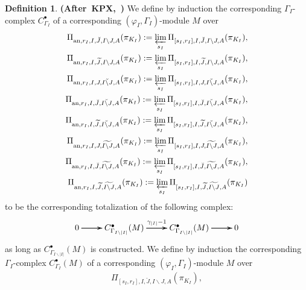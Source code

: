 \documentclass[12pt]{amsart}
\theoremstyle{definition}
\newtheorem{definition}[theorem]{Definition}
\numberwithin{equation}{section}
\begin{document}
\begin{definition} \mbox{\bf{(After KPX, \cite[Definition 2.3.3]{KPX})}}
We define by induction the corresponding $\Gamma_I$-complex $C^\bullet_{\Gamma_I}$ of a corresponding $(\varphi_I,\Gamma_I)$-module $M$ over 
\begin{align}
\Pi_{\mathrm{an},r_I,I,\breve{J},I\backslash J,A}(\pi_{K_I}):=\varprojlim_{s_I}\Pi_{[s_I,r_I],I,\breve{J},I\backslash J,A}(\pi_{K_I}),\\	
\Pi_{\mathrm{an},r_I,I,\widetilde{J},I\backslash J,A}(\pi_{K_I}):=\varprojlim_{s_I} \Pi_{[s_I,r_I],I,\widetilde{J},I\backslash J,A}(\pi_{K_I}),\\
\Pi_{\mathrm{an},r_I,I,J,\breve{I\backslash J},A}(\pi_{K_I}):=\varprojlim_{s_I}\Pi_{[s_I,r_I],I,J,\breve{I\backslash J},A}(\pi_{K_I}),\\	
\Pi_{\mathrm{an},r_I,I,\breve{J},\breve{I\backslash J},A}(\pi_{K_I}):=\varprojlim_{s_I} \Pi_{[s_I,r_I],I,\breve{J},\breve{I\backslash J},A}(\pi_{K_I}),\\	
\Pi_{\mathrm{an},r_I,I,\widetilde{J},\breve{I\backslash J},A}(\pi_{K_I}):=\varprojlim_{s_I} \Pi_{[s_I,r_I],I,\widetilde{J},\breve{I\backslash J},A}(\pi_{K_I}),\\
\Pi_{\mathrm{an},r_I,I,J,\widetilde{I\backslash J},A}(\pi_{K_I}):=\varprojlim_{s_I} \Pi_{[s_I,r_I],I,J,\widetilde{I\backslash J},A}(\pi_{K_I}),\\	
\Pi_{\mathrm{an},r_I,I,\breve{J},\widetilde{I\backslash J},A}(\pi_{K_I}):=\varprojlim_{s_I} \Pi_{[s_I,r_I],I,\breve{J},\widetilde{I\backslash J},A}(\pi_{K_I}),\\	
\Pi_{\mathrm{an},r_I,I,\widetilde{J},\widetilde{I\backslash J},A}(\pi_{K_I}):=\varprojlim_{s_I} \Pi_{[s_I,r_I],I,\widetilde{J},\widetilde{I\backslash J},A}(\pi_{K_I})	
\end{align}
to be the corresponding totalization of the following complex:
\[
\xymatrix@C+0pc@R+0pc{
0 \ar[r] \ar[r] \ar[r] &C^\bullet_{\Gamma_{I\backslash |I|}}(M) \ar[r]^{\gamma_{|I|}-1}\ar[r]\ar[r] &C^\bullet_{\Gamma_{I\backslash |I|}}(M) \ar[r] \ar[r] \ar[r] &0
}
\]
as long as $C^\bullet_{\Gamma_{I\backslash |I|}}(M)$ is constructed. We define by induction the corresponding $\Gamma_I$-complex $C^\bullet_{\Gamma_I}(M)$ of a corresponding $(\varphi_I,\Gamma_I)$-module $M$ over
\begin{align}
\Pi_{[s_I,r_I],I,\breve{J},I\backslash J,A}(\pi_{K_I}),\\	

\end{align}
\end{definition}
\end{document}
